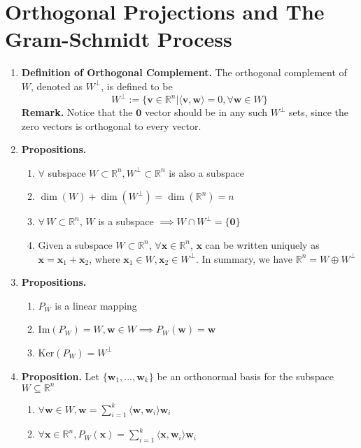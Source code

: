 \documentclass[oneside, 12pt]{book}
\newcommand{\settag}[1]{\renewcommand{\theenumi}{#1}}
\newcommand{\R}{\mathbb{R}}
\newcommand{\tbf}[1]{\textbf{#1}}
\newcommand{\para}[1]{\item \tbf{#1}}
\newcommand{\vv}{\mathbf{v}}
\newcommand{\vw}{\mathbf{w}}
\newcommand{\vx}{\mathbf{x}}
\newcommand{\vzero}{\mathbf{0}}
\begin{document}
\section{Orthogonal Projections and The Gram-Schmidt Process}
\begin{enumerate}
    \settag{4.4.1}
    \para{Definition of Orthogonal Complement.} The orthogonal complement of $W$, denoted as 
    $W^{\perp}$, is defined to be
    \begin{equation*}
        W^\perp := \{\vv\in \R^n | \langle \vv,\vw\rangle = 0, \forall \vw \in W\}
    \end{equation*}
    \textbf{Remark.} Notice that the $\vzero$ vector should be in any such $W^\perp$ sets, 
    since the zero vectors is orthogonal to every vector.
    
    \settag{4.4.3}
    \para{Propositions.}
    \begin{enumerate}
        \item $\forall$ subspace $W \subset \R^n, W^\perp\subset \R^n$ is also a subspace
        \item $\dim(W) + \dim(W^\perp) = \dim(\R^n) = n$
        \item $\forall\, W\subset \R^n$, $W$ is a subspace $\implies W \cap W^\perp = \{\vzero\}$
        \item Given a subspace $W\subset \R^n$, $\forall \vx \in \R^n$, $\vx$ can be written 
        uniquely as $\vx = \vx_1 + \vx_2$, where $\vx_1 \in W, \vx_2 \in W^\perp$. In summary, 
        we have $\R^n = W \oplus W^\perp$
    \end{enumerate}
    
    \settag{4.4.5}
    \para{Propositions.}
    \begin{enumerate}
        \item $P_W$ is a linear mapping
        \item Im$(P_W) = W, \vw \in W \implies P_W(\vw) = \vw$
        \item Ker$(P_W) = W^\perp$
    \end{enumerate}
    
    \settag{4.4.6}
    \para{Proposition.} Let $\{\vw_1,...,\vw_k\}$ be an orthonormal basis for the subspace $W \subseteq \R^n$
    \begin{enumerate}
        \item $\forall \vw \in W, \vw = \sum_{i = 1}^k \langle \vw,\vw_i \rangle \vw_i$
        \item $\forall \vx \in \R^n, P_W(\vx) = \sum_{i = 1}^k \langle \vx,\vw_i \rangle \vw_i$
    \end{enumerate}
    

\end{enumerate}
\end{document}
